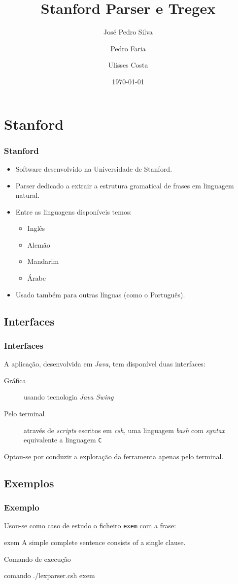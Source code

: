 \documentclass{beamer}
\title{Stanford Parser e Tregex}
\author{José Pedro Silva \and
Pedro Faria \and
Ulisses Costa
}
\date{\today}
\institute{Engenharia de Linguagens\\
Processamento de Linguagem Natural
}
\begin{document}
\begin{frame}
   \titlepage
\end{frame}

\section{Stanford}
\begin{frame} \frametitle{Stanford}
\begin{itemize}
 \item Software desenvolvido na Universidade de Stanford.
 \item Parser dedicado a extrair a estrutura gramatical de frases em linguagem natural.
 \item Entre as linguagens disponíveis temos: \begin{itemize}
                                               \item Inglês
					       \item Alemão
					       \item Mandarim
					       \item Árabe
                                              \end{itemize}
 \item Usado também para outras línguas (como o Português).
\end{itemize}

\end{frame}

\subsection{Interfaces}
\begin{frame} \frametitle{Interfaces}
 A aplicação, desenvolvida em \emph{Java}, tem disponível duas interfaces:
\begin{description}
 \item [Gráfica] usando tecnologia \emph{Java Swing}
 \item [Pelo terminal] através de \emph{scripts} escritos em \emph{csh}, uma linguagem \emph{bash} com \emph{syntax} equivalente a linguagem \texttt{C}
\end{description}
Optou-se por conduzir a exploração da ferramenta apenas pelo terminal.
\end{frame}

\subsection{Exemplos}
\begin{frame} \frametitle{Exemplo}
 Usou-se como caso de estudo o ficheiro \texttt{exem} com a frase:
 
\begin{block}{exem}
A simple complete sentence consists of a single clause.
\end{block}

Comando de execução

\begin{block}{comando}
./lexparser.csh exem
\end{block}

\end{frame}
\end{document}
